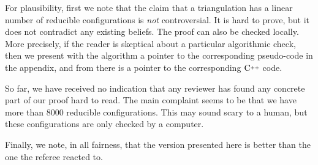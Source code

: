 \documentclass[10pt,a4paper]{article}
\def\Cpp{\textnormal C\raisebox{0.5ex}{\tiny++}}
\begin{document}
{{For plausibility, first we note that the claim that a triangulation has a linear number of reducible configurations is {\em not} controversial. It is hard to prove, but it does
 not contradict any existing beliefs. 
The proof can also be checked locally. More precisely, if the reader is skeptical about a particular algorithmic check, then we present with the algorithm a pointer to the corresponding pseudo-code in the appendix, and from there is a pointer to the corresponding $\Cpp$ code.

So far, we have received no indication that any reviewer has found any concrete part of our proof hard to read. The main complaint seems to be that we have more than 8000 reducible configurations. This may sound scary to a human,  but these configurations are only checked by a computer.

Finally, we note, in all fairness, that the version presented here is better than the one the referee reacted to.
}}
\end{document}
